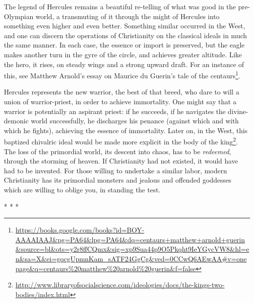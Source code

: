 The legend of Hercules remains a beautiful re-telling of what was good in the pre-Olympian world, a transmuting of it through the might of Hercules into something even higher and even better. Something similar occurred in the West, and one can discern the operations of Christianity on the classical ideals in much the same manner. In each case, the essence or import is preserved, but the eagle makes another turn in the gyre of the circle, and achieves greater altitude. Like the hero, it rises, on steady wings and a strong upward draft. For an instance of this, see Matthew Arnold's essay on Maurice du Guerin's tale of the centaurs\footnote{\url{https://books.google.com/books?id=BOY-AAAAIAAJ\&pg=PA64\&lpg=PA64\&dq=centaurs+matthew+arnold+guerin\&source=bl\&ots=y2r8ffCQmx\&sig=xp9Sua44p9O5Pkqht9IeYGycVW8\&hl=en\&sa=X\&ei=gqcgUpmnKam\_sATF24GgCg\&ved=0CCwQ6AEwAA\#v=onepage\&q=centaurs\%20matthew\%20arnold\%20guerin\&f=false}}.

Hercules represents the new warrior, the best of that breed, who dare to will a union of warrior-priest, in order to achieve immortality. One might say that a warrior is potentially an aspirant priest: if he succeeds, if he navigates the divine-demonic world successfully, he discharges his penance (against which and with which he fights), achieving the essence of immortality. Later on, in the West, this baptized chivalric ideal would be made more explicit in the body of the king\footnote{\url{http://www.libraryofsocialscience.com/ideologies/docs/the-kings-two-bodies/index.html}}. The loss of the primordial world, its descent into chaos, has to be \emph{redeemed}, through the storming of heaven. If Christianity had not existed, it would have had to be invented. For those willing to undertake a similar labor, modern Christianity has its primordial monsters and jealous and offended goddesses which are willing to oblige you, in standing the test.



\begin{center}* * *\end{center}

